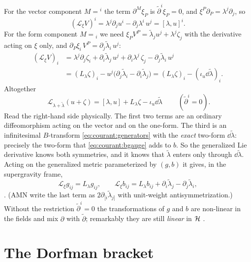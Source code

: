 For the vector component $M={}^i$ the term $\partial^M\xi_P$ is $\tilde\partial^i\xi_P=0$, and
$\xi^P\partial_P=\lambda^j\partial_j$, so
\[
(\mathcal L_\xi V)^i=\lambda^j\partial_ju^i-\partial_j\lambda^i\,u^j=[\lambda,u]^i .
\]
For the form component $M={}_i$ we need $\xi_PV^P=\tilde\lambda_ju^j+\lambda^j\zeta_j$ with the
derivative acting on $\xi$ only, and $\partial_P\xi_i\,V^P=\partial_j\tilde\lambda_i\,u^j$:
\begin{align*}
(\mathcal L_\xi V)_i&=\lambda^j\partial_j\zeta_i+\partial_i\tilde\lambda_j\,u^j
+\partial_i\lambda^j\,\zeta_j-\partial_j\tilde\lambda_i\,u^j\\
&=(L_\lambda\zeta)_i-u^j\bigl(\partial_j\tilde\lambda_i-\partial_i\tilde\lambda_j\bigr)
=(L_\lambda\zeta)_i-(\iota_u\dd\tilde\lambda)_i .
\end{align*}
Altogether
\begin{equation}\label{eq:courant:dorfman}
\boxed{\;\mathcal L_{\lambda+\tilde\lambda}(u+\zeta)=[\lambda,u]+L_\lambda\zeta-\iota_u\dd\tilde\lambda\;}
\qquad(\tilde\partial^i=0).
\end{equation}
Read the right-hand side physically. The first two terms are an ordinary diffeomorphism acting on
the vector and on the one-form. The third is an infinitesimal $B$-transform
\eqref{eq:courant:generators} with the \emph{exact} two-form $\dd\tilde\lambda$: precisely the
two-form that \eqref{eq:courant:bgauge} adds to $b$. So the generalized Lie derivative knows both
symmetries, and it knows that $\tilde\lambda$ enters only through $\dd\tilde\lambda$. Acting on the
generalized metric parameterized by $(g,b)$ it gives, in the supergravity frame,
\begin{equation}\label{eq:courant:deltagb}
\mathcal L_\xi g_{ij}=L_\lambda g_{ij},\qquad
\mathcal L_\xi b_{ij}=L_\lambda b_{ij}+\partial_i\tilde\lambda_j-\partial_j\tilde\lambda_i ,
\end{equation}
 \TL. (AMN write the last term as
$2\partial_{[i}\tilde\lambda_{j]}$ with unit-weight antisymmetrization.) Without the restriction
$\tilde\partial^i=0$ the transformations of $g$ and $b$ are non-linear in the fields and mix
$\partial$ with $\tilde\partial$; remarkably they are still \emph{linear} in $\mathcal{H}$
.

\section{The Dorfman bracket}\label{sec:courant:dorfman}

